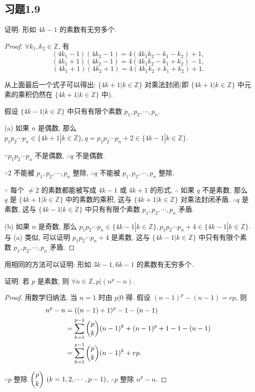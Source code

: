 \documentclass{ctexart}
\begin{document}
\subsection{习题1.9}
\begin{exercise}%
    证明: 形如 $4k-1$ 的素数有无穷多个.
\end{exercise}
\begin{proof}
    $\forall k_1,k_2\in\mathbb{Z}$, 有
    \[(4k_1-1)(4k_2-1)=4(4k_1k_2-k_1-k_2)+1,\]
    \[(4k_1+1)(4k_2-1)=4(4k_1k_2-k_1+k_2)-1,\]
    \[(4k_1+1)(4k_2+1)=4(4k_1k_2+k_1+k_2)+1.\]

    从上面最后一个式子可以得出: $\{4k+1|k\in\mathbb{Z}\}$ 对乘法封闭(即 $\{4k+1|k\in\mathbb{Z}\}$ 中元素的乘积仍然在 $\{4k+1|k\in\mathbb{Z}\}$ 中).

    假设 $\{4k-1|k\in\mathbb{Z}\}$ 中只有有限个素数 $p_1,p_2,\cdots,p_n$.
    
    (a) 如果 $n$ 是偶数, 那么 $p_1p_2\cdots p_n\in\{4k+1|k\in\mathbb{Z}\},q=p_1p_2\cdots p_n+2\in\{4k-1|k\in\mathbb{Z}\}$.
    
    $\because p_1p_2\cdots p_n$ 不是偶数, $\therefore q$ 不是偶数.
    
    $\because2$ 不能被 $p_1,p_2,\cdots,p_n$ 整除, $\therefore q$ 不能被 $p_1,p_2,\cdots,p_n$ 整除.

    $\because$ 每个 $\neq2$ 的素数都能被写成 $4k-1$ 或 $4k+1$ 的形式, $\therefore$ 如果 $q$ 不是素数, 那么 $q$ 是 $\{4k+1|k\in\mathbb{Z}\}$ 中的素数的乘积, 这与 $\{4k+1|k\in\mathbb{Z}\}$ 对乘法封闭矛盾. $\therefore q$ 是素数, 这与 $\{4k-1|k\in\mathbb{Z}\}$ 中只有有限个素数 $p_1,p_2,\cdots,p_n$ 矛盾.

    (b) 如果 $n$ 是奇数, 那么 $p_1p_2\cdots p_n\in\{4k-1|k\in\mathbb{Z}\},p_1p_2\cdots p_n+4\in\{4k-1|k\in\mathbb{Z}\}$. 与 (a) 类似, 可以证明 $p_1p_2\cdots p_n+4$ 是素数, 这与 $\{4k-1|k\in\mathbb{Z}\}$ 中只有有限个素数 $p_1,p_2,\cdots,p_n$ 矛盾.
\end{proof}
\begin{note}
    用相同的方法可以证明: 形如 $3k-1,6k-1$ 的素数有无穷多个.
\end{note}
\addtocounter{exercise}{2}
\begin{exercise}%
    证明: 若 $p$ 是素数, 则 $\forall n\in\mathbb{Z},p|(n^p-n)$.
\end{exercise}
\begin{proof}
    用数学归纳法. 当 $n=1$ 时由 $p|0$ 得. 假设 $(n-1)^p-(n-1)=rp$, 则
    \begin{align*}
        n^p-n & =((n-1)+1)^p-1-(n-1) \\
        & =\sum\limits_{k=1}^{p-1}\dbinom{p}{k}(n-1)^k+(n-1)^p+1-1-(n-1) \\
        & =\sum\limits_{k=1}^{p-1}\dbinom{p}{k}(n-1)^k+rp.
    \end{align*}

    $\because p$ 整除 $\dbinom{p}{k}\ (k=1,2,\cdots,p-1)$, $\therefore p$ 整除 $n^p-n$.
\end{proof}
\end{document}
